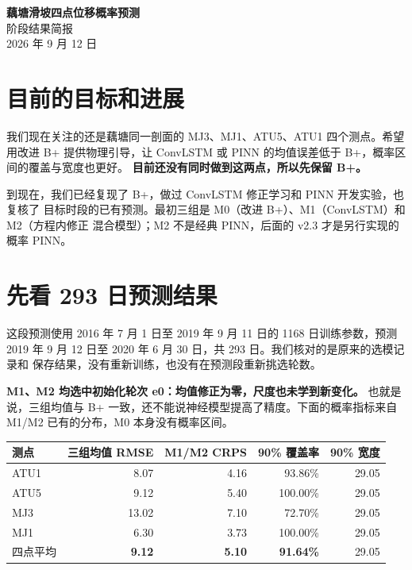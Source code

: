 \documentclass[UTF8,zihao=-4]{ctexart}
\begin{document}
\pagestyle{plain}

\begin{center}
  {\bfseries 藕塘滑坡四点位移概率预测}\\[0.25em]
  {\large 阶段结果简报}\\[0.25em]
  {\small 2026 年 9 月 12 日}
\end{center}

\section{目前的目标和进展}

我们现在关注的还是藕塘同一剖面的 MJ3、MJ1、ATU5、ATU1 四个测点。希望用改进 B+
提供物理引导，让 ConvLSTM 或 PINN 的均值误差低于 B+，概率区间的覆盖与宽度也更好。
\textbf{目前还没有同时做到这两点，所以先保留 B+。}

到现在，我们已经复现了 B+，做过 ConvLSTM 修正学习和 PINN 开发实验，也复核了
目标时段的已有预测。最初三组是 M0（改进 B+）、M1（ConvLSTM）和 M2（方程内修正
混合模型）；M2 不是经典 PINN，后面的 v2.3 才是另行实现的概率 PINN。

\section{先看 293 日预测结果}

这段预测使用 2016 年 7 月 1 日至 2019 年 9 月 11 日的 1168 日训练参数，预测
2019 年 9 月 12 日至 2020 年 6 月 30 日，共 293 日。我们核对的是原来的选模记录和
保存结果，没有重新训练，也没有在预测段重新挑选轮数。

\textbf{M1、M2 均选中初始化轮次 e0：均值修正为零，尺度也未学到新变化。}
也就是说，三组均值与 B+ 一致，还不能说神经模型提高了精度。下面的概率指标来自
M1/M2 已有的分布，M0 本身没有概率区间。

\begin{center}
\small
\begin{tabularx}{\textwidth}{@{}Yrrrr@{}}
\toprule
测点 & 三组均值 RMSE & M1/M2 CRPS & 90\% 覆盖率 & 90\% 宽度 \\
\midrule
ATU1 & 8.07 & 4.16 & 93.86\% & 29.05 \\
ATU5 & 9.12 & 5.40 & 100.00\% & 29.05 \\
MJ3  & 13.02 & 7.10 & 72.70\% & 29.05 \\
MJ1  & 6.30 & 3.73 & 100.00\% & 29.05 \\
\midrule
四点平均 & \textbf{9.12} & \textbf{5.10} & \textbf{91.64\%} & 29.05 \\
\bottomrule
\end{tabularx}
\end{center}
\end{document}

